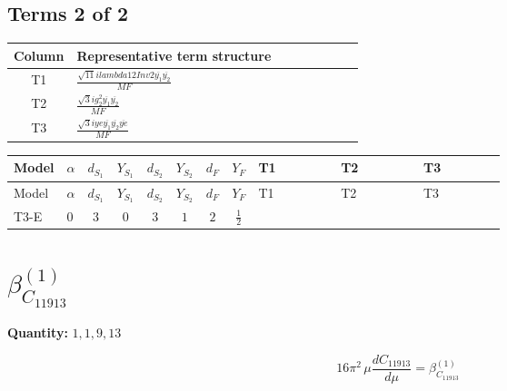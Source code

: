 \documentclass[8pt]{article}
\begin{document}
\begin{landscape}
\subsection*{Terms 2 of 2}
\begin{center}
\begin{tabular}{@{}c >{\raggedright\arraybackslash}p{0.82\linewidth}@{}}
\toprule
Column & Representative term structure \\
\midrule
T1 & \(\displaystyle \frac{\sqrt{11} i lambda12Inv2 \overline{y_{1}} \overline{y_{2}}}{MF}\) \\
\midrule
T2 & \(\displaystyle \frac{\sqrt{3} i g_{2}^{2} \overline{y_{1}} \overline{y_{2}}}{MF}\) \\
\midrule
T3 & \(\displaystyle \frac{\sqrt{3} i ye \overline{y_{1}} \overline{y_{2}} \overline{ye}}{MF}\) \\
\midrule
\bottomrule
\end{tabular}
\end{center}
\smallskip
\tiny
\begin{longtable}{@{}llcccccc >{\raggedright\arraybackslash}p{0.21\linewidth} >{\raggedright\arraybackslash}p{0.21\linewidth} >{\raggedright\arraybackslash}p{0.21\linewidth}@{}}
\toprule
Model & $\alpha$ & $d_{S_1}$ & $Y_{S_1}$ & $d_{S_2}$ & $Y_{S_2}$ & $d_F$ & $Y_F$ & T1 & T2 & T3 \\
\midrule
\endfirsthead
\toprule
Model & $\alpha$ & $d_{S_1}$ & $Y_{S_1}$ & $d_{S_2}$ & $Y_{S_2}$ & $d_F$ & $Y_F$ & T1 & T2 & T3 \\
\midrule
\endhead
T3-E & $0$ & $3$ & $0$ & $3$ & $1$ & $2$ & $\frac{1}{2}$ & \scriptsize\adjustbox{max width=\linewidth}{$\begin{gathered} \frac{3 \sqrt{11} i lambda12Inv2 \overline{y_{1}} \overline{y_{2}}}{22 MF}\end{gathered}$} & \scriptsize\adjustbox{max width=\linewidth}{$\begin{gathered} \frac{11 \sqrt{3} i g_{2}^{2} \overline{y_{1}} \overline{y_{2}}}{8 MF}\end{gathered}$} & \scriptsize\adjustbox{max width=\linewidth}{$\begin{gathered} - \frac{\sqrt{3} i ye \overline{y_{1}} \overline{y_{2}} \overline{ye}}{12 MF}\end{gathered}$} \\
\midrule
\bottomrule
\end{longtable}
\clearpage
\section*{$\beta_{C_{11913}}^{(1)}$}
\noindent\textbf{Quantity: }$\mathrm{1,1,9,13}$\par\smallskip
\[16\pi^2\,\mu\frac{d C_{11913}}{d\mu}=\beta_{C_{11913}}^{(1)}\]

\end{landscape}
\end{document}
